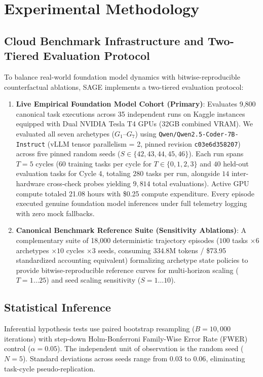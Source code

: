 \documentclass[conference]{IEEEtran}
\begin{document}
\section{Experimental Methodology}
\label{sec:setup}

\subsection{Cloud Benchmark Infrastructure and Two-Tiered Evaluation Protocol}
To balance real-world foundation model dynamics with bitwise-reproducible counterfactual ablations, SAGE implements a two-tiered evaluation protocol:
\begin{enumerate}
    \item \textbf{Live Empirical Foundation Model Cohort (Primary)}: Evaluates 9,800 canonical task executions across 35 independent runs on Kaggle instances equipped with Dual NVIDIA Tesla T4 GPUs (32GB combined VRAM). We evaluated all seven archetypes ($G_1$--$G_7$) using \texttt{Qwen/Qwen2.5-Coder-7B-Instruct} (vLLM tensor parallelism = 2, pinned revision \texttt{c03e6d358207}) across five pinned random seeds ($S \in \{42, 43, 44, 45, 46\}$). Each run spans $T=5$ cycles ($60$ training tasks per cycle for $T \in \{0, 1, 2, 3\}$ and $40$ held-out evaluation tasks for Cycle 4, totaling $280$ tasks per run, alongside $14$ inter-hardware cross-check probes yielding $9{,}814$ total evaluations). Active GPU compute totaled 21.08 hours with \$0.25 compute expenditure. Every episode executed genuine foundation model inferences under full telemetry logging with zero mock fallbacks.
    \item \textbf{Canonical Benchmark Reference Suite (Sensitivity Ablations)}: A complementary suite of 18,000 deterministic trajectory episodes ($100$ tasks $\times 6$ archetypes $\times 10$ cycles $\times 3$ seeds, consuming 334.8M tokens / \$73.95 standardized accounting equivalent) formalizing archetype state policies to provide bitwise-reproducible reference curves for multi-horizon scaling ($T=1\dots 25$) and seed scaling sensitivity ($S=1\dots 10$).
\end{enumerate}

\subsection{Statistical Inference}
Inferential hypothesis tests use paired bootstrap resampling ($B=10{,}000$ iterations) with step-down Holm-Bonferroni Family-Wise Error Rate (FWER) control ($\alpha=0.05$). The independent unit of observation is the random seed ($N=5$). Standard deviations across seeds range from $0.03$ to $0.06$, eliminating task-cycle pseudo-replication.
\end{document}
